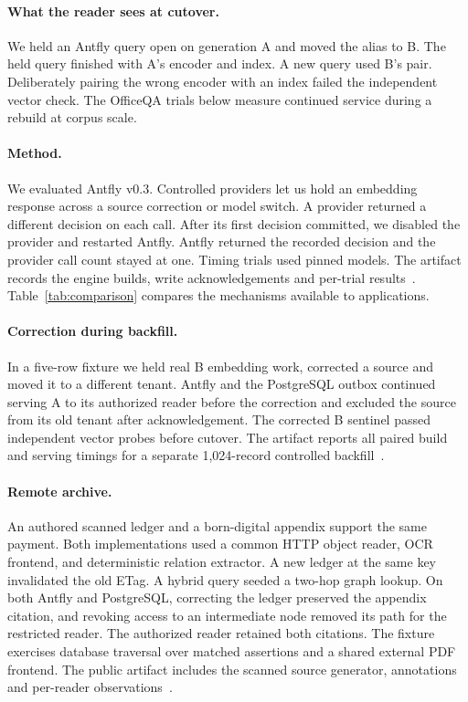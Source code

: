 \documentclass[sigconf,nonacm]{acmart}
\begin{document}
\paragraph{What the reader sees at cutover.} We held an Antfly query open on
generation A and moved the alias to B. The held query finished with A's
encoder and index. A new query used B's pair. Deliberately pairing the
wrong encoder with an index failed the independent vector check. The OfficeQA
trials below measure continued service during a rebuild at corpus scale.

\paragraph{Method.} We evaluated Antfly v0.3. Controlled providers let us
hold an embedding response across a source correction or model switch.
A provider returned a different decision on each call. After its first
decision committed, we disabled the provider and restarted Antfly. Antfly
returned the recorded decision and the provider call count stayed at one.
Timing trials used pinned models. The artifact records the engine builds,
write acknowledgements and per-trial results~\cite{antfly-paper-repo}.
Table~\ref{tab:comparison} compares the mechanisms available to applications.

\paragraph{Correction during backfill.}
In a five-row fixture we held real B
embedding work, corrected a source and moved it to a different tenant.
Antfly and the PostgreSQL outbox continued serving A to its authorized reader before the
correction and excluded the source from its old tenant after acknowledgement.
The corrected B sentinel passed independent vector probes before cutover.
The artifact reports all paired build and serving timings for a separate
1,024-record controlled backfill~\cite{antfly-paper-repo}.

\paragraph{Remote archive.}
An authored scanned ledger and a born-digital appendix support the same
payment. Both implementations used a common HTTP object reader, OCR frontend,
and deterministic relation extractor. A new ledger at the same key invalidated
the old ETag. A hybrid query seeded a two-hop graph lookup. On both Antfly
and PostgreSQL, correcting the ledger preserved the appendix citation, and
revoking access to an intermediate node removed its path for the restricted
reader. The authorized reader retained both citations. The fixture exercises
database traversal over matched assertions and a shared external PDF frontend.
The public artifact includes the scanned source generator, annotations and
per-reader observations~\cite{antfly-paper-repo}.
\end{document}
